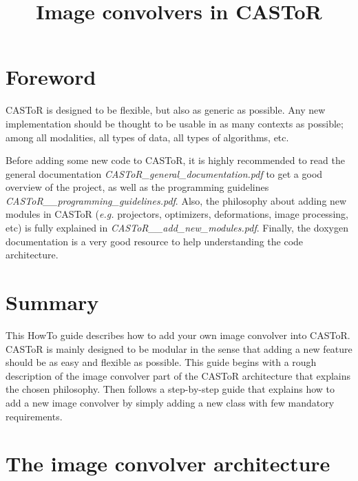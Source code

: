 \documentclass[a4paper, 11pt]{article}
\begin{document}
\title{Image convolvers in CASToR}
\maketitle

\section*{Foreword}

CASToR is designed to be flexible, but also as generic as possible.
Any new implementation should be thought to be usable in as many contexts as possible; among all modalities, all types of data, all types of algorithms, etc.

Before adding some new code to CASToR, it is highly recommended to read the general documentation \textit{CASToR\_general\_documentation.pdf} to get a good overview of the project, as well as the programming guidelines \textit{CASToR\_\_programming\_guidelines.pdf}.
Also, the philosophy about adding new modules in CASToR (\textit{e.g.} projectors, optimizers, deformations, image processing, etc) is fully explained in \textit{CASToR\_\_add\_new\_modules.pdf}.
Finally, the doxygen documentation is a very good resource to help understanding the code architecture.

\section{Summary}

This HowTo guide describes how to add your own image convolver into CASToR. CASToR is mainly designed to be modular in the sense that adding a new feature should
be as easy and flexible as possible. This guide begins with a rough description of the image convolver part of the CASToR architecture that explains the chosen philosophy.
Then follows a step-by-step guide that explains how to add a new image convolver by simply adding a new class with few mandatory requirements.

\section{The image convolver architecture}
\end{document}
